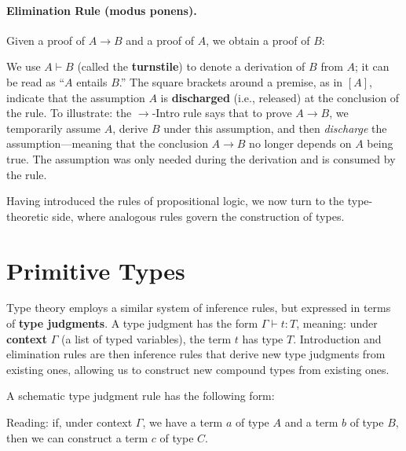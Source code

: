 \paragraph{Elimination Rule (modus ponens).}
Given a proof of $A \to B$ and a proof of $A$, we obtain a proof
of $B$:
\begin{prooftree}
\end{prooftree}

\begin{notation}
  We use $A \vdash B$ (called the \textbf{turnstile}) to denote a
  derivation of $B$ from $A$; it can be read as ``$A$ entails $B$.''
  The square brackets around a premise, as in $[A]$, indicate that
  the assumption $A$ is \textbf{discharged} (i.e., released) at the
  conclusion of the rule.
  To illustrate: the $\to$-Intro rule says that to prove
  $A \to B$, we temporarily assume $A$, derive $B$ under this
  assumption, and then \emph{discharge} the assumption---meaning
  that the conclusion $A \to B$ no longer depends on $A$ being true.
  The assumption was only needed during the derivation and is consumed
  by the rule.
\end{notation}

Having introduced the rules of propositional logic, we now turn to
the type-theoretic side, where analogous rules govern the
construction of types.

\section{Primitive Types}\label{sec:primitive_types}

Type theory employs a similar system of inference rules, but
expressed in terms of \textbf{type judgments}.
A type judgment has the form $\Gamma \vdash t : T$,
meaning: under \textbf{context} $\Gamma$ (a list of typed variables),
the term $t$ has type $T$.
Introduction and elimination rules are then inference rules that
derive new type judgments from existing ones, allowing us to construct
new compound types from existing ones.

\begin{example}
  A schematic type judgment rule has the following form:
  \begin{prooftree}
  \end{prooftree}
  Reading: if, under context $\Gamma$, we have a term $a$ of type $A$
  and a term $b$ of type $B$, then we can construct a term $c$ of
  type $C$.
\end{example}

